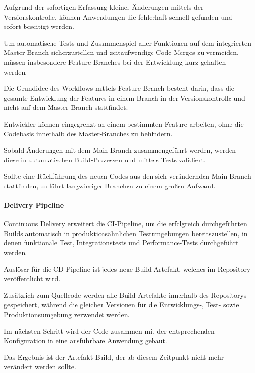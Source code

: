 Aufgrund der sofortigen Erfassung kleiner Änderungen mittels der Versionskontrolle, können Anwendungen die fehlerhaft schnell gefunden und sofort beseitigt werden. \cite[S. 57]{humble_continuous_2011}

Um automatische Tests und Zusammenspiel aller Funktionen auf dem integrierten Master-Branch sicherzustellen und zeitaufwendige Code-Merges zu vermeiden, müssen insbesondere Feature-Branches bei der Entwicklung kurz gehalten werden. \cite{meyer_continuous_2014}

Die Grundidee des Workflows mittels Feature-Branch besteht darin, dass die gesamte Entwicklung der Features in einem Branch in der Versionskontrolle und nicht auf dem Master-Branch stattfindet. \cite[S. 44 - 45]{verona_practical_2016} 

Entwickler können eingegrenzt an einem bestimmten Feature arbeiten, ohne die Codebasis innerhalb des Master-Branches zu behindern.  

Sobald Änderungen mit dem Main-Branch zusammengeführt werden, werden diese in automatischen Build-Prozessen und mittels Tests validiert. 

Sollte eine Rückführung des neuen Codes aus den sich verändernden Main-Branch stattfinden, so führt langwieriges Branchen zu einem großen Aufwand. \cite{juner_praxisbasierte_2017}  

\paragraph{Delivery Pipeline} 

Continuous Delivery erweitert die CI-Pipeline, um die erfolgreich durchgeführten Builds automatisch in produktionsähnlichen Testumgebungen bereitszustellen, in denen funktionale Test, Integrationstests und Performance-Tests durchgeführt werden. \cite[S. 17]{sharma_devops_2017}

Auslöser für die CD-Pipeline ist jedes neue Build-Artefakt, welches im Repository veröffentlicht wird.

Zusätzlich zum Quellcode werden alle Build-Artefakte innerhalb des Repositorys gespeichert, während die gleichen Versionen für die Entwicklungs-, Test- sowie Produktionsumgebung verwendet werden. \cite[S. 109 - 110]{kim_devops-handbuch_2017}

Im nächsten Schritt wird der Code zusammen mit der entsprechenden Konfiguration in eine ausführbare Anwendung gebaut. 

Das Ergebnis ist der Artefakt Build, der ab diesem Zeitpunkt nicht mehr verändert werden sollte. 

